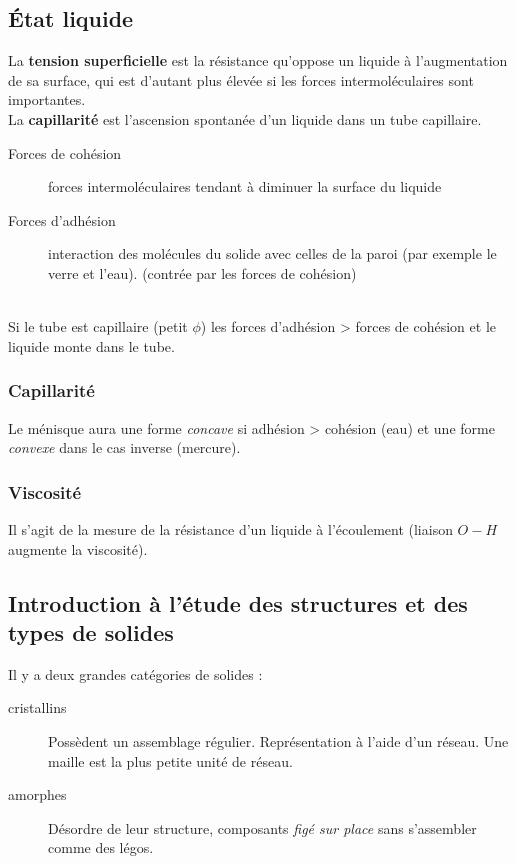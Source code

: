 \documentclass[12pt, a4paper]{article}
\begin{document}
\subsection{État liquide}
La \textbf{tension superficielle} est la résistance qu'oppose un liquide à l'augmentation de sa surface, qui est d'autant plus élevée si les forces intermoléculaires sont importantes.\\

La \textbf{capillarité} est l'ascension spontanée d'un liquide dans un tube capillaire.
\begin{description}
\item[Forces de cohésion] forces intermoléculaires tendant à diminuer la surface du liquide
\item[Forces d'adhésion] interaction des molécules du solide avec celles de la paroi (par exemple le verre et l'eau). (contrée par les forces de cohésion)
\end{description}
\ \\
Si le tube est capillaire (petit $\phi$) les forces d'adhésion > forces de cohésion et le liquide monte dans le tube.

\subsubsection*{Capillarité}
Le ménisque aura une forme \textit{concave} si adhésion > cohésion (eau) et une forme \textit{convexe} dans le cas inverse (mercure).

\subsubsection*{Viscosité}
Il s'agit de la mesure de la résistance d'un liquide à l'écoulement (liaison $O-H$ augmente la viscosité).

\subsection{Introduction à l'étude des structures et des types de solides}
Il y a deux grandes catégories de solides : 
\begin{description}
\item[cristallins] Possèdent un assemblage régulier. Représentation à l'aide d'un réseau. Une maille est la plus petite unité de réseau.
\item[amorphes] Désordre de leur structure, composants \textit{figé sur place} sans s'assembler comme des légos.
\end{description}
\end{document}
